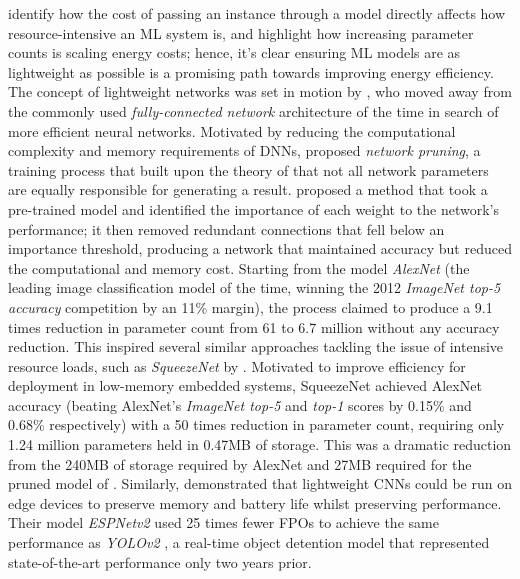 \documentclass[a4paper, 12pt]{article}
\begin{document}
    \citet{schwartz-2019} identify how the cost of passing an instance through a model directly affects how resource-intensive an ML system is, and \citet{bender-2021} highlight how increasing parameter counts is scaling energy costs; hence, it's clear ensuring ML models are as lightweight as possible is a promising path towards improving energy efficiency. The concept of lightweight networks was set in motion by \citet{han-2015}, who moved away from the commonly used \emph{fully-connected network} architecture of the time in search of more efficient neural networks. Motivated by reducing the computational complexity and memory requirements of DNNs, \citet{han-2015} proposed \emph{network pruning}, a training process that built upon the theory of \citet{hanson-1988} that not all network parameters are equally responsible for generating a result. \citet{han-2015} proposed a method that took a pre-trained model and identified the importance of each weight to the network's performance; it then removed redundant connections that fell below an importance threshold, producing a network that maintained accuracy but reduced the computational and memory cost. Starting from the model \emph{AlexNet} (the leading image classification model of the time, winning the 2012 \emph{ImageNet top-5 accuracy} competition by an 11\% margin), the process claimed to produce a 9.1 times reduction in parameter count from 61 to 6.7 million without any accuracy reduction. This inspired several similar approaches tackling the issue of intensive resource loads, such as \emph{SqueezeNet} by \citet{iandola-2016}. Motivated to improve efficiency for deployment in low-memory embedded systems, SqueezeNet achieved AlexNet accuracy (beating AlexNet's \emph{ImageNet top-5} and \emph{top-1} scores by 0.15\% and 0.68\% respectively) with a 50 times reduction in parameter count, requiring only 1.24 million parameters held in 0.47MB of storage. This was a dramatic reduction from the 240MB of storage required by AlexNet and 27MB required for the pruned model of \citet{han-2015}. Similarly, \citet{mehta-2018} demonstrated that lightweight CNNs could be run on edge devices to preserve memory and battery life whilst preserving performance. Their model \emph{ESPNetv2} used 25 times fewer FPOs to achieve the same performance as \emph{YOLOv2} \citep{redmon-2016}, a real-time object detention model that represented state-of-the-art performance only two years prior.
\end{document}
